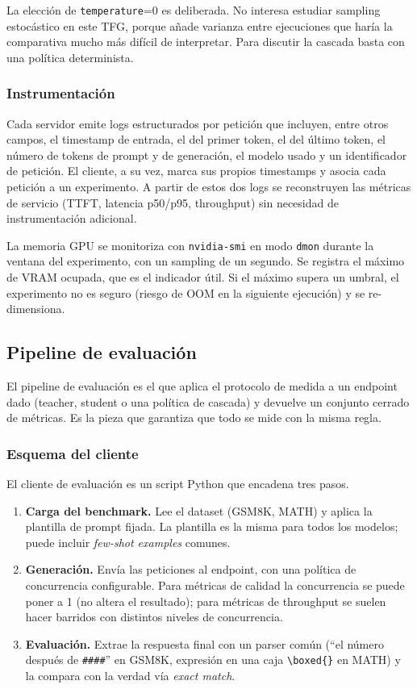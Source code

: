 La elección de \texttt{temperature}=0 es deliberada. No interesa estudiar sampling estocástico en este TFG, porque añade varianza entre ejecuciones que haría la comparativa mucho más difícil de interpretar. Para discutir la cascada basta con una política determinista.

\subsubsection{Instrumentación}

Cada servidor emite logs estructurados por petición que incluyen, entre otros campos, el timestamp de entrada, el del primer token, el del último token, el número de tokens de prompt y de generación, el modelo usado y un identificador de petición. El cliente, a su vez, marca sus propios timestamps y asocia cada petición a un experimento. A partir de estos dos logs se reconstruyen las métricas de servicio (TTFT, latencia p50/p95, throughput) sin necesidad de instrumentación adicional.

La memoria GPU se monitoriza con \texttt{nvidia-smi} en modo \texttt{dmon} durante la ventana del experimento, con un sampling de un segundo. Se registra el máximo de VRAM ocupada, que es el indicador útil. Si el máximo supera un umbral, el experimento no es seguro (riesgo de OOM en la siguiente ejecución) y se re-dimensiona.

\subsection{Pipeline de evaluación}

El pipeline de evaluación es el que aplica el protocolo de medida a un endpoint dado (teacher, student o una política de cascada) y devuelve un conjunto cerrado de métricas. Es la pieza que garantiza que todo se mide con la misma regla.

\subsubsection{Esquema del cliente}

El cliente de evaluación es un script Python que encadena tres pasos.

\begin{enumerate}[nosep,leftmargin=*]
\item \textbf{Carga del benchmark.} Lee el dataset (GSM8K, MATH) y aplica la plantilla de prompt fijada. La plantilla es la misma para todos los modelos; puede incluir \textit{few-shot examples} comunes.
\item \textbf{Generación.} Envía las peticiones al endpoint, con una política de concurrencia configurable. Para métricas de calidad la concurrencia se puede poner a 1 (no altera el resultado); para métricas de throughput se suelen hacer barridos con distintos niveles de concurrencia.
\item \textbf{Evaluación.} Extrae la respuesta final con un parser común (``el número después de \texttt{\#\#\#\#}'' en GSM8K, expresión en una caja \texttt{\textbackslash boxed\{\}} en MATH) y la compara con la verdad vía \textit{exact match}.
\end{enumerate}

